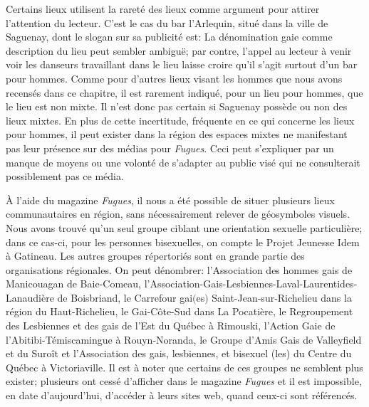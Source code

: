 Certains lieux utilisent la rareté des lieux \lgbt{} comme argument pour attirer l'attention du lecteur.
C'est le cas du bar l'Arlequin, situé dans la ville de Saguenay, dont le slogan sur sa publicité est: 
La dénomination gaie comme description du lieu peut sembler ambiguë; par contre, l'appel au lecteur à venir voir les danseurs travaillant dans le lieu laisse croire qu'il s'agit surtout d'un bar pour hommes.
Comme pour d'autres lieux visant les hommes que nous avons recensés dans ce chapitre, il est rarement indiqué, pour un lieu pour hommes, que le lieu est non mixte.
Il n'est donc pas certain si Saguenay possède ou non des lieux mixtes.
En plus de cette incertitude, fréquente en ce qui concerne les lieux pour hommes, il peut exister dans la région des espaces mixtes ne manifestant pas leur présence sur des médias pour \emph{Fugues}.
Ceci peut s'expliquer par un manque de moyens ou une volonté de s'adapter au public visé qui ne consulterait possiblement pas ce média.

À l'aide du magazine \emph{Fugues}, il nous a été possible de situer plusieurs lieux communautaires en région, sans nécessairement relever de géosymboles visuels.
Nous avons trouvé qu'un seul groupe ciblant une orientation sexuelle particulière; dans ce cas-ci, pour les personnes bisexuelles, on compte le Projet Jeunesse Idem à Gatineau.
Les autres groupes répertoriés sont en grande partie des organisations régionales.
On peut dénombrer: l'Association des hommes gais de Manicouagan de Baie-Comeau, l'Association-Gais-Lesbiennes-Laval-Laurentides-Lanaudière de Boisbriand, le Carrefour gai$($es$)$ Saint-Jean-sur-Richelieu dans la région du Haut-Richelieu, le Gai-Côte-Sud dans La Pocatière, le Regroupement des Lesbiennes et des gais de l'Est du Québec à Rimouski, l'Action Gaie de l'Abitibi-Témiscamingue à Rouyn-Noranda, le Groupe d'Amis Gais de Valleyfield et du Suroît et l'Association des gais, lesbiennes, et bisexuel (les) du Centre du Québec à Victoriaville.
Il est à noter que certains de ces groupes ne semblent plus exister; plusieurs ont cessé d'afficher dans le magazine \emph{Fugues} et il est impossible, en date d'aujourd'hui, d'accéder à leurs sites web, quand ceux-ci sont référencés.

